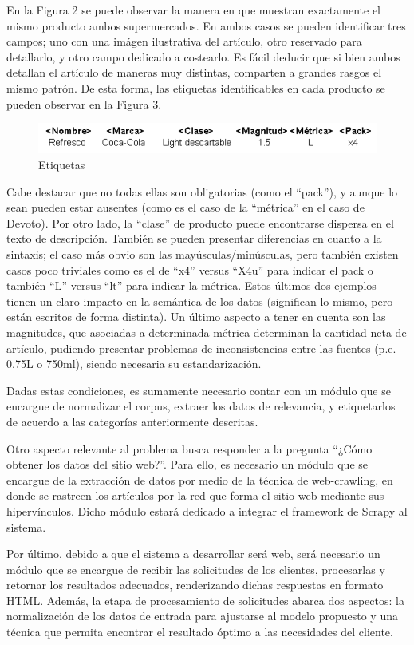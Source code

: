 \documentclass[12pt]{article} %
\begin{document}
En la Figura 2 se puede observar la manera en que muestran exactamente el mismo producto ambos supermercados. En ambos casos se pueden identificar tres campos; uno con una imágen ilustrativa del artículo, otro reservado para detallarlo, y otro campo dedicado a costearlo. Es fácil deducir que si bien ambos detallan el artículo de maneras muy distintas, comparten a grandes rasgos el mismo patrón. De esta forma, las etiquetas identificables en cada producto se pueden observar en la Figura 3.

\begin{figure}[H]
\includegraphics[scale=1]{etiquetas}
\centering
\caption{Etiquetas}
\end{figure}

Cabe destacar que no todas ellas son obligatorias (como el “pack”), y aunque lo sean pueden estar ausentes (como es el caso de la “métrica” en el caso de Devoto). Por otro lado, la “clase” de producto puede encontrarse dispersa en el texto de descripción. También se pueden presentar diferencias en cuanto a la sintaxis; el caso más obvio son las mayúsculas/minúsculas, pero también existen casos poco triviales como es el de “x4” versus “X4u” para indicar el pack o también “L” versus “lt” para indicar la métrica. Estos últimos dos ejemplos tienen un claro impacto en la semántica de los datos (significan lo mismo, pero están escritos de forma distinta). Un último aspecto a tener en cuenta son las magnitudes, que asociadas a determinada métrica determinan la cantidad neta de artículo, pudiendo presentar problemas de inconsistencias entre las fuentes (p.e. 0.75L o 750ml), siendo necesaria su estandarización. 

Dadas  estas condiciones, es sumamente necesario contar con un módulo que se encargue de normalizar el corpus, extraer los datos de relevancia, y etiquetarlos de acuerdo a las categorías anteriormente descritas.

Otro aspecto relevante al problema busca responder a la pregunta “¿Cómo obtener los datos del sitio web?”. Para ello, es necesario un módulo que se encargue de la extracción de datos por medio de la técnica de web-crawling, en donde se rastreen los artículos por la red que forma el sitio web mediante sus hipervínculos. Dicho módulo estará dedicado a integrar el framework de Scrapy al sistema.

Por último, debido a que el sistema a desarrollar será web, será necesario un módulo que se encargue de recibir las solicitudes de los clientes, procesarlas y retornar los resultados adecuados, renderizando dichas respuestas en formato HTML. Además, la etapa de procesamiento de solicitudes abarca dos aspectos: la normalización de los datos de entrada para ajustarse al modelo propuesto y una técnica que permita encontrar el resultado óptimo a las necesidades del cliente.
\end{document}
